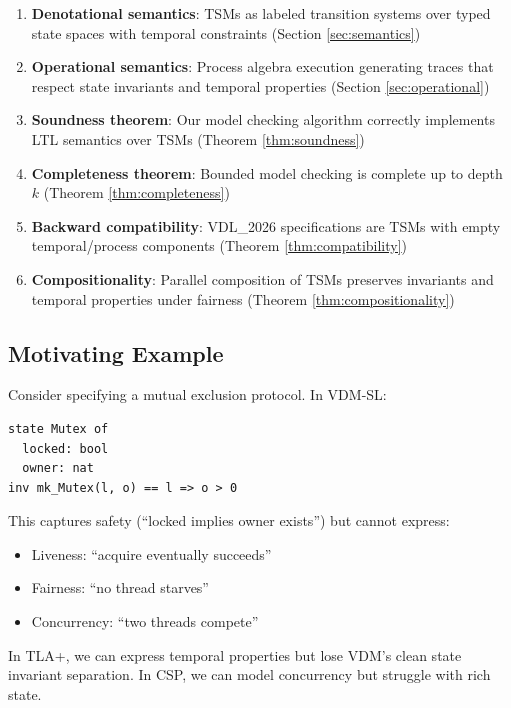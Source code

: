 \documentclass[conference]{IEEEtran}
\begin{document}
\begin{enumerate}
\item \textbf{Denotational semantics}: TSMs as labeled transition systems over typed state spaces with temporal constraints (Section \ref{sec:semantics})

\item \textbf{Operational semantics}: Process algebra execution generating traces that respect state invariants and temporal properties (Section \ref{sec:operational})

\item \textbf{Soundness theorem}: Our model checking algorithm correctly implements LTL semantics over TSMs (Theorem \ref{thm:soundness})

\item \textbf{Completeness theorem}: Bounded model checking is complete up to depth $k$ (Theorem \ref{thm:completeness})

\item \textbf{Backward compatibility}: VDL\_2026 specifications are TSMs with empty temporal/process components (Theorem \ref{thm:compatibility})

\item \textbf{Compositionality}: Parallel composition of TSMs preserves invariants and temporal properties under fairness (Theorem \ref{thm:compositionality})
\end{enumerate}

\subsection{Motivating Example}

Consider specifying a mutual exclusion protocol. In VDM-SL:

\begin{lstlisting}[caption={VDM-SL (state invariants only)}]
state Mutex of
  locked: bool
  owner: nat
inv mk_Mutex(l, o) == l => o > 0
\end{lstlisting}

This captures safety (``locked implies owner exists'') but cannot express:
\begin{itemize}
\item Liveness: ``acquire eventually succeeds''
\item Fairness: ``no thread starves''
\item Concurrency: ``two threads compete''
\end{itemize}

In TLA+, we can express temporal properties but lose VDM's clean state invariant separation. In CSP, we can model concurrency but struggle with rich state.
\end{document}

